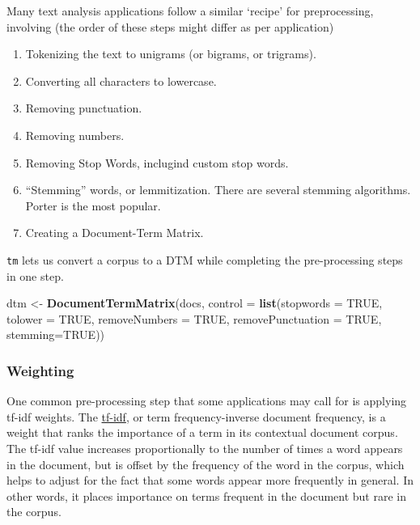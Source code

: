 \documentclass[
]{book}
\newenvironment{Shaded}{\begin{snugshade}}{\end{snugshade}}
\newcommand{\DataTypeTok}[1]{\textcolor[rgb]{0.13,0.29,0.53}{#1}}
\newcommand{\KeywordTok}[1]{\textcolor[rgb]{0.13,0.29,0.53}{\textbf{#1}}}
\newcommand{\NormalTok}[1]{#1}
\newcommand{\OtherTok}[1]{\textcolor[rgb]{0.56,0.35,0.01}{#1}}
\newcommand{\StringTok}[1]{\textcolor[rgb]{0.31,0.60,0.02}{#1}}
\providecommand{\tightlist}{%
  \setlength{\itemsep}{0pt}\setlength{\parskip}{0pt}}
\begin{document}
Many text analysis applications follow a similar `recipe' for preprocessing, involving (the order of these steps might differ as per application)

\begin{enumerate}
\def\labelenumi{\arabic{enumi}.}
\tightlist
\item
  Tokenizing the text to unigrams (or bigrams, or trigrams).
\item
  Converting all characters to lowercase.
\item
  Removing punctuation.
\item
  Removing numbers.
\item
  Removing Stop Words, inclugind custom stop words.
\item
  ``Stemming'' words, or lemmitization. There are several stemming algorithms. Porter is the most popular.
\item
  Creating a Document-Term Matrix.
\end{enumerate}

\texttt{tm} lets us convert a corpus to a DTM while completing the pre-processing steps in one step.

\begin{Shaded}
\begin{Highlighting}[]
\NormalTok{dtm <-}\StringTok{ }\KeywordTok{DocumentTermMatrix}\NormalTok{(docs,}
           \DataTypeTok{control =} \KeywordTok{list}\NormalTok{(}\DataTypeTok{stopwords =} \OtherTok{TRUE}\NormalTok{,}
                          \DataTypeTok{tolower =} \OtherTok{TRUE}\NormalTok{,}
                          \DataTypeTok{removeNumbers =} \OtherTok{TRUE}\NormalTok{,}
                          \DataTypeTok{removePunctuation =} \OtherTok{TRUE}\NormalTok{,}
                          \DataTypeTok{stemming=}\OtherTok{TRUE}\NormalTok{))}
\end{Highlighting}
\end{Shaded}

\hypertarget{weighting}{%
\subsubsection*{Weighting}\label{weighting}}

One common pre-processing step that some applications may call for is applying tf-idf weights. The \href{https://en.wikipedia.org/wiki/Tf\%E2\%80\%93idf}{tf-idf}, or term frequency-inverse document frequency, is a weight that ranks the importance of a term in its contextual document corpus. The tf-idf value increases proportionally to the number of times a word appears in the document, but is offset by the frequency of the word in the corpus, which helps to adjust for the fact that some words appear more frequently in general. In other words, it places importance on terms frequent in the document but rare in the corpus.
\end{document}
